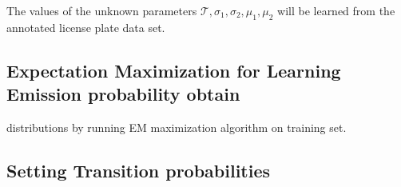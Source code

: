 \documentclass[a4paper,12pt]{article}
\newcounter{ohNoteCounter}
\newcommand{\ohnote}[1]{{\scriptsize  \color{Cgreen} $\clubsuit$~\refstepcounter{ohNoteCounter}\textsf{[OH]$_{\arabic{ohNoteCounter}}$:{#1}}}}
\renewcommand{\ohnote}[1]{}
\begin{document}
  The values of the unknown parameters $\mathcal{T}, \sigma_1,
  \sigma_2, \mu_1, \mu_2$ will be learned from the annotated license
  plate data set.

  

  \subsection{Expectation Maximization for Learning Emission
    probability obtain}

  
  distributions by running EM maximization algorithm on training set.
 

  

  \ohnote{Describe usage of EM alg.}


  \subsection{Setting Transition probabilities}
\end{document}
